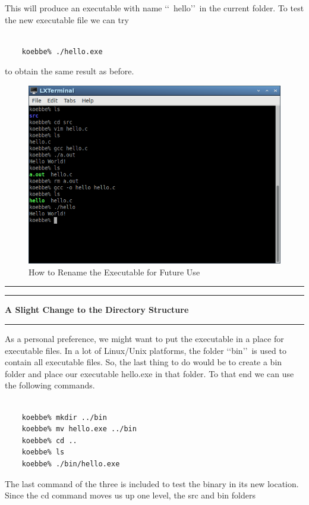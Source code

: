 \documentclass[10pt,fleqn]{article}
\begin{document}
This will produce an executable with name \lq\lq\ hello\rq\rq\ in the current
folder. To test the new executable file we can try
\begin{verbatim}

    koebbe% ./hello.exe

\end{verbatim}
to obtain the same result as before.
\begin{figure}[h]
\centering
\includegraphics[width=5.0in]{../images/hello_world_09.png}
\caption{How to Rename the Executable for Future Use}
\end{figure}
\eject
\vskip0.1in\hrule\vskip0.1in
\vfill
\vskip0.1in\hrule\vskip0.1in \noindent
{\bf A Slight Change to the Directory Structure} 
\vskip0.1in\hrule\vskip0.1in \noindent
As a personal preference, we might want to put the executable in a place for
executable files. In a lot of Linux/Unix platforms, the folder \lq\lq bin\rq\rq\
is used to contain all executable files. So, the last thing to do would be to
create a bin folder and place our executable hello.exe in that folder. To that
end we can use the following commands.
\begin{verbatim}

    koebbe% mkdir ../bin
    koebbe% mv hello.exe ../bin
    koebbe% cd ..
    koebbe% ls
    koebbe% ./bin/hello.exe

\end{verbatim}
The last command of the three is included to test the binary in its new
location. Since the cd command moves us up one level, the src and bin folders
\end{document}
